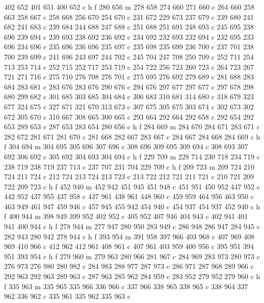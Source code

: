 {{   402 652 401 651 400 652 c
   h f
   280 656 m
   278 658 274 660 271 660 c
   264 660 258 663 258 667 c
   258 668 256 670 254 670 c
   231 672 229 673 237 679 c
   239 680 241 682 241 683 c
   239 684 244 688 247 688 c
   251 688 251 691 248 693 c
   245 695 238 696 239 694 c
   239 693 238 692 236 692 c
   234 692 232 693 232 694 c
   232 695 233 696 234 696 c
   235 696 236 696 235 697 c
   235 698 235 699 236 700 c
   237 701 238 700 239 699 c
   241 696 243 697 244 702 c
   245 704 247 708 250 709 c
   252 711 254 713 253 714 c
   252 715 252 717 253 719 c
   254 722 256 723 260 723 c
   264 723 267 721 271 716 c
   275 710 276 708 276 701 c
   275 695 276 692 279 689 c
   281 688 283 684 283 681 c
   283 676 283 676 290 676 c
   294 676 297 677 297 677 c
   297 678 298 680 299 682 c
   301 685 303 685 304 684 c
   306 683 310 681 314 680 c
   318 679 323 677 324 675 c
   327 671 321 670 313 673 c
   307 675 305 675 303 674 c
   302 673 302 672 305 670 c
   310 667 308 665 300 665 c
   293 664 292 664 292 658 c
   292 654 292 653 289 653 c
   287 653 283 654 280 656 c
   h f
   284 669 m
   284 670 284 671 283 671 c
   282 672 281 671 281 670 c
   281 668 282 667 283 667 c
   284 667 284 668 284 669 c
   h f
   304 694 m
   304 695 305 696 307 696 c
   308 696 309 695 309 694 c
   308 693 307 692 306 692 c
   305 692 304 693 304 694 c
   h f
   229 709 m
   228 714 230 718 234 719 c
   238 719 238 719 237 713 c
   237 707 231 704 229 709 c
   h f
   209 723 m
   209 724 210 724 211 724 c
   212 724 213 724 213 723 c
   213 722 212 721 211 721 c
   210 721 209 722 209 723 c
   h f
   452 940 m
   452 942 451 945 451 948 c
   451 951 450 952 447 952 c
   442 952 437 955 437 958 c
   437 961 438 961 448 960 c
   459 959 464 956 463 950 c
   463 949 461 947 459 946 c
   457 945 455 942 454 940 c
   454 937 454 937 452 940 c
   h f
   400 944 m
   398 949 399 952 402 952 c
   405 952 407 946 404 943 c
   402 941 401 941 400 944 c
   h f
   278 944 m
   277 947 280 950 283 949 c
   286 948 286 947 284 945 c
   282 943 280 942 278 944 c
   h f
   393 954 m
   391 958 397 966 403 968 c
   407 969 408 969 410 966 c
   412 962 412 961 408 961 c
   407 961 403 959 400 956 c
   395 951 394 951 393 954 c
   h f
   279 960 m
   279 963 280 966 281 967 c
   284 969 283 973 280 973 c
   276 973 276 980 280 982 c
   284 983 288 977 287 973 c
   286 971 287 968 289 966 c
   292 963 292 963 289 963 c
   287 963 285 962 284 959 c
   283 952 279 952 279 960 c
   h f
   335 963 m
   335 965 335 966 336 966 c
   337 966 338 965 338 965 c
   338 964 337 962 336 962 c
   335 961 335 962 335 963 c
}}
